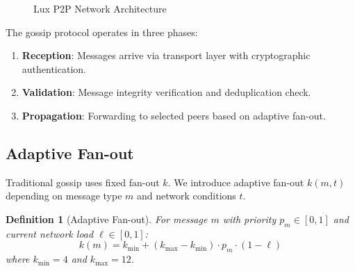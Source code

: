 \documentclass[11pt,a4paper]{article}
\newtheorem{definition}{Definition}
\begin{document}
\begin{figure}[htbp]
\centering
{}
\caption{Lux P2P Network Architecture}
\label{fig:architecture}
\end{figure}

The gossip protocol operates in three phases:

\begin{enumerate}
    \item \textbf{Reception}: Messages arrive via transport layer with cryptographic authentication.
    \item \textbf{Validation}: Message integrity verification and deduplication check.
    \item \textbf{Propagation}: Forwarding to selected peers based on adaptive fan-out.
\end{enumerate}

\subsection{Adaptive Fan-out}

Traditional gossip uses fixed fan-out $k$. We introduce adaptive fan-out $k(m, t)$ depending on message type $m$ and network conditions $t$.

\begin{definition}[Adaptive Fan-out]
For message $m$ with priority $p_m \in [0, 1]$ and current network load $\ell \in [0, 1]$:
\[
k(m) = k_{\min} + (k_{\max} - k_{\min}) \cdot p_m \cdot (1 - \ell)
\]
where $k_{\min} = 4$ and $k_{\max} = 12$.
\end{definition}
\end{document}
